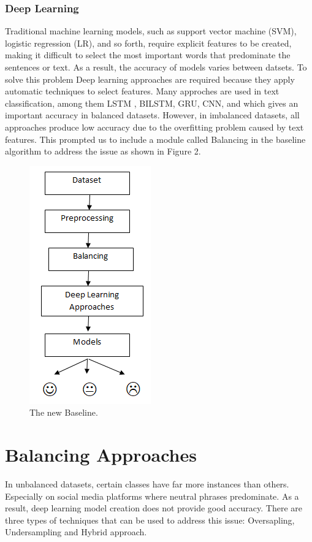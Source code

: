 \documentclass[conference]{IEEEtran}
\begin{document}
	\subsubsection{Deep Learning}	
Traditional machine learning models, such as support vector machine (SVM), logistic regression (LR), and so forth, require explicit features to be created, making it difficult to select the most important words that predominate the sentences or text. As a result, the accuracy of models varies between datsets. To solve this problem Deep learning approaches are required  because they apply automatic techniques to select features. Many approches are used in text classification, among them LSTM , BILSTM, GRU, CNN, and which gives an important accuracy in balanced datasets. However, in imbalanced datasets, all approaches produce low accuracy due to the overfitting problem caused by text features. This prompted us to include a module called Balancing in the baseline algorithm to address the issue as shown in Figure 2. 


\begin{figure}[htbp]
	\centerline{\includegraphics[scale=0.70]{images/balancing}}
	\caption{The new Baseline.}
	\label{fig}
\end{figure}

	\section{Balancing Approaches}
	In unbalanced datasets, certain classes have far more instances than others. Especially on social media platforms where neutral phrases predominate. As a result, deep learning model creation does not provide good accuracy.  There are three types of techniques that can be used to address this issue: Oversapling, Undersampling and Hybrid approach.\\
\end{document}
